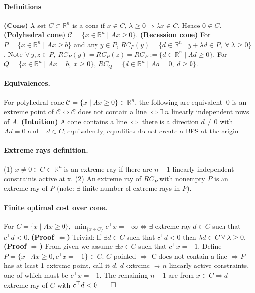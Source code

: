 \documentclass{article}
\begin{document}
\paragraph{Definitions}\textbf{(Cone)} A set $C\subset\mathbb R^n$ is a cone if $x\in C,\ \lambda\ge 0 \Rightarrow \lambda x \in C$. Hence $0\in C.$
\textbf{(Polyhedral cone)} $\mathcal C = \{x\in \mathbb R^n \mid Ax \geq 0\}$.
\textbf{(Recession cone)} For $P = \{x\in \mathbb R^n\mid Ax \geq b\}$ and any $y\in P$,  $RC_P(y) = \{d \in \mathbb R^n \mid y + \lambda d \in P,\;\forall\ \lambda \geq 0\}$. Note $\forall\ y,z\in P,\ RC_P(y) = RC_P(z) = RC_P := \{d\in \mathbb R^n\mid Ad \geq 0\}$. For $Q = \{x\in \mathbb R^n\mid Ax = b,\ x\geq 0\},\ RC_Q = \{d\in \mathbb R^n \mid Ad = 0,\ d\geq 0\}$. 


\paragraph{Equivalences.} For polyhedral cone $\mathcal C = \{x\mid Ax\geq0\} \subset \mathbb R^n$, the following are equivalent: $0$ is an extreme point of $\mathcal C\iff \mathcal C$ does not contain a line $\iff \exists\ n$ linearly independent rows of $A$. \textbf{(Intuition)} A cone contains a line $\iff$ there is a direction $d\neq 0$ with $Ad=0$ and $-d\in C$; equivalently, equalities do not create a BFS at the origin.


\paragraph{Extreme rays definition.} (1) $x\neq 0 \in C \subset \mathbb R^n$ is an extreme ray if there are $n-1$ linearly independent constraints active at x. (2) An extreme ray of $RC_P$ with nonempty $P$ is an extreme ray of $P$ (note: $\exists$ finite number of extreme rays in $P$). 

\paragraph{Finite optimal cost over cone.} For $C=\{x\mid Ax\geq 0\}$, $\min_{\{x \in C\}} c^\top x = -\infty \iff \exists$ extreme ray $d\in C$ such that $c^\top d < 0$. \textbf{(Proof $\Leftarrow$)} Trivial: If $\exists d\in C$ such that $c^\top d < 0$ then $\lambda d\in C\ \forall\ \lambda \geq 0$. \textbf{(Proof $\Rightarrow$)} From given we assume $\exists x\in C$ such that $c^\top x = -1$. Define $P = \{x \mid Ax \geq 0, c^\top x = -1\}\subset C$. $C$ pointed $\Rightarrow $ C does not contain a line $\Rightarrow P$ has at least 1 extreme point, call it $d$. $d$ extreme $\Rightarrow n$ linearly active constraints, one of which must be $c^\top x = -1$. The remaining $n-1$ are from $x \in C \Longrightarrow d$ extreme ray of $C$ with $c^\top d < 0 \qed$ 
\end{document}
